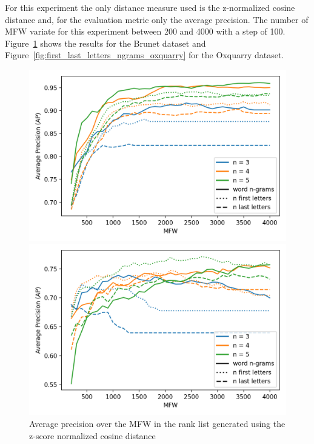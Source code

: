 For this experiment the only distance measure used is the z-normalized cosine distance and, for the evaluation metric only the average precision.
The number of MFW variate for this experiment between 200 and 4000 with a step of 100.
Figure~\ref{fig:first_last_letters_ngrams_brunet} shows the results for the Brunet dataset and Figure~\ref{fig:first_last_letters_ngrams_oxquarry} for the Oxquarry dataset.

\begin{figure}
  \centering
  \caption{Average precision over the MFW in the rank list generated using the z-score normalized cosine distance}

  \label{fig:first_last_letters_ngrams_oxquarry}
  \includegraphics[width=\linewidth]{img/first_last_letters_ngrams_oxquarry.png}

  \label{fig:first_last_letters_ngrams_brunet}
  \includegraphics[width=\linewidth]{img/first_last_letters_ngrams_brunet.png}
\end{figure}

